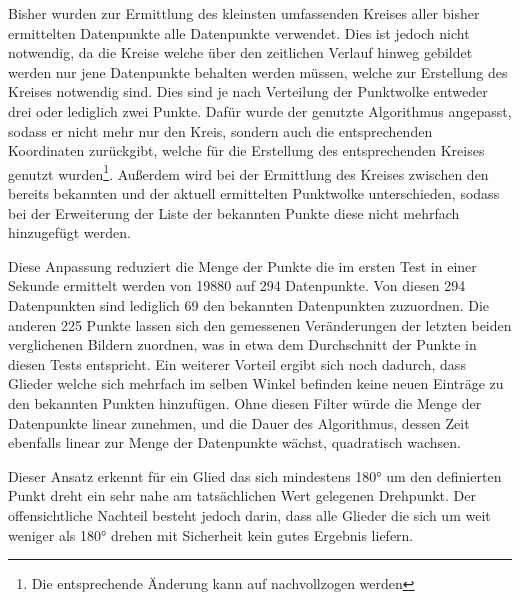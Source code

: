 Bisher wurden zur Ermittlung des kleinsten umfassenden Kreises aller bisher ermittelten Datenpunkte alle Datenpunkte verwendet.
Dies ist jedoch nicht notwendig, da die Kreise welche über den zeitlichen Verlauf hinweg gebildet werden nur jene Datenpunkte behalten werden müssen, welche zur Erstellung des Kreises notwendig sind.
Dies sind je nach Verteilung der Punktwolke entweder drei oder lediglich zwei Punkte.
Dafür wurde der genutzte Algorithmus angepasst, sodass er nicht mehr nur den Kreis, sondern auch die entsprechenden Koordinaten zurückgibt, welche für die Erstellung des entsprechenden Kreises genutzt wurden\footnote{Die entsprechende Änderung kann auf  nachvollzogen werden}.
Außerdem wird bei der Ermittlung des Kreises zwischen den bereits bekannten und der aktuell ermittelten Punktwolke unterschieden, sodass bei der Erweiterung der Liste der bekannten Punkte diese nicht mehrfach hinzugefügt werden.

Diese Anpassung reduziert die Menge der Punkte die im ersten Test in einer Sekunde ermittelt werden von 19880 auf 294 Datenpunkte.
Von diesen 294 Datenpunkten sind lediglich 69 den bekannten Datenpunkten zuzuordnen.
Die anderen 225 Punkte lassen sich den gemessenen Veränderungen der letzten beiden verglichenen Bildern zuordnen, was in etwa dem Durchschnitt der Punkte in diesen Tests entspricht.
Ein weiterer Vorteil ergibt sich noch dadurch, dass Glieder welche sich mehrfach im selben Winkel befinden keine neuen Einträge zu den bekannten Punkten hinzufügen.
Ohne diesen Filter würde die Menge der Datenpunkte linear zunehmen, und die Dauer des Algorithmus, dessen Zeit ebenfalls linear zur Menge der Datenpunkte wächst, quadratisch wachsen.


Dieser Ansatz erkennt für ein Glied das sich mindestens 180° um den definierten Punkt dreht ein sehr nahe am tatsächlichen Wert gelegenen Drehpunkt.
Der offensichtliche Nachteil besteht jedoch darin, dass alle Glieder die sich um weit weniger als 180° drehen mit Sicherheit kein gutes Ergebnis liefern.

